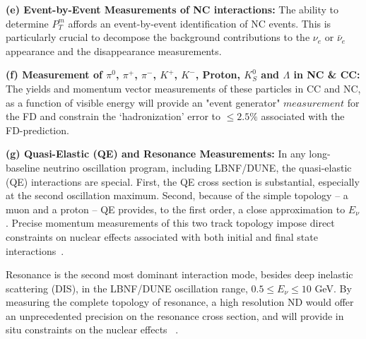 \vspace{0.25cm} 
\noindent 
{\bf (e) Event-by-Event Measurements of NC interactions:} The ability to determine  { \bf{ $P^m_T$}} affords an event-by-event 
identification of NC events. This is particularly crucial to decompose the background contributions to 
the $\nu_e$ or $\bar \nu_e$ appearance and the disappearance measurements. 


\vspace{0.25cm} 
\noindent 
{\bf (f) Measurement of $\pi^0$, $\pi^+$, $\pi^-$, $K^+$, $K^-$, Proton, $K^0_S$ and $\Lambda$ in NC \& CC:} 
The yields and momentum vector measurements of these particles in CC and NC, as a function of 
visible energy will provide an "event generator" $measurement$ for the FD and constrain the 
`hadronization' error to $\leq 2.5\%$ associated with the FD-prediction. 




\vspace{0.25cm} 
\noindent 
{\bf (g) Quasi-Elastic (QE) and Resonance Measurements:}  
In any long-baseline neutrino oscillation program, including LBNF/DUNE, 
the quasi-elastic (QE) interactions are special. First, the QE cross section is substantial, especially at the second oscillation maximum. 
Second, because of the simple topology -- a muon and a proton -- QE provides, to the first order, 
a close approximation to $E_\nu$.  
Precise momentum measurements  of this two track topology impose direct constraints on nuclear effects 
associated with both initial and final state interactions~\cite{ND-QE}. 

\vspace{0.25cm}
\noindent
Resonance is the second most dominant interaction mode, besides deep inelastic scattering (DIS),  
in the LBNF/DUNE oscillation range, $0.5 \leq E_\nu \leq 10$ GeV.
 By measuring the complete 
topology of resonance, a high resolution ND 
would offer an unprecedented precision on the resonance cross section, and will provide in situ constraints on the 
nuclear effects ~\cite{ND-RES}.  




